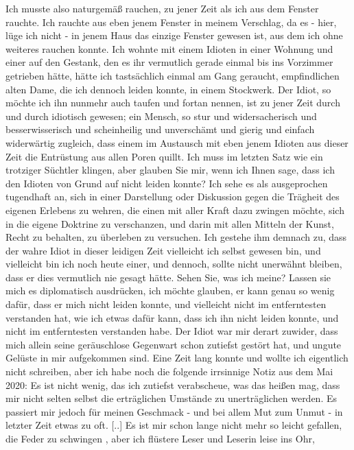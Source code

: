 \documentclass{scrbook}
\begin{document}
Ich musste also naturgemäß rauchen, zu jener Zeit als ich aus dem Fenster
rauchte. Ich rauchte aus eben jenem Fenster in meinem Verschlag, da es -
 hier,
lüge ich nicht - in jenem Haus das einzige Fenster gewesen ist, aus dem
 ich
ohne weiteres rauchen konnte. Ich wohnte mit einem Idioten in einer
 Wohnung und
einer auf den Gestank, den es ihr vermutlich gerade einmal bis
 ins Vorzimmer
getrieben hätte, hätte ich tastsächlich einmal am Gang
 geraucht, empfindlichen
alten Dame, die ich dennoch leiden konnte, in einem
 Stockwerk. Der Idiot, so
möchte ich ihn nunmehr auch taufen und fortan
 nennen, ist zu jener Zeit durch
und durch idiotisch gewesen; ein Mensch, so
 stur und widersacherisch und
besserwisserisch und scheinheilig und
 unverschämt und gierig und einfach
widerwärtig zugleich, dass einem im
 Austausch mit eben jenem Idioten aus dieser
Zeit die Entrüstung aus allen
 Poren quillt. Ich muss im letzten Satz wie ein
trotziger Süchtler klingen,
 aber glauben Sie mir, wenn ich Ihnen sage, dass ich
den Idioten von Grund auf
 nicht leiden konnte? Ich sehe es als ausgeprochen
tugendhaft an, sich in
 einer Darstellung oder Diskussion gegen die Trägheit des
eigenen Erlebens zu
 wehren, die einen mit aller Kraft dazu zwingen möchte, sich
in die eigene
 Doktrine zu verschanzen, und darin mit allen Mitteln der Kunst,
Recht zu
 behalten, zu überleben zu versuchen. Ich gestehe ihm demnach zu, dass
der
 wahre Idiot in dieser leidigen Zeit vielleicht ich selbst gewesen bin, und
vielleicht bin ich noch heute einer, und dennoch, sollte nicht unerwähnt
bleiben, dass er dies vermutlich nie gesagt hätte. Sehen Sie, was ich meine?
Lassen sie mich es diplomatisch ausdrücken, ich möchte glauben, er kann genau
so wenig dafür, dass er mich nicht leiden konnte, und vielleicht nicht im
entferntesten verstanden hat, wie ich etwas dafür kann, dass ich ihn nicht
leiden konnte, und nicht im entferntesten verstanden habe. Der Idiot war mir
derart zuwider, dass mich allein seine geräuschlose Gegenwart schon zutiefst
gestört hat, und ungute Gelüste in mir aufgekommen sind. Eine Zeit lang
 konnte
und wollte ich eigentlich nicht schreiben, aber ich habe noch die
 folgende
irrsinnige Notiz aus dem Mai 2020: Es ist nicht wenig, das ich
 zutiefst
verabscheue, was das heißen mag, dass mir nicht selten selbst die
 erträglichen
Umstände zu unerträglichen werden. Es passiert mir jedoch für
 meinen Geschmack
- und bei allem Mut zum Unmut - in letzter Zeit etwas zu
 oft. [..] Es ist mir
schon lange nicht mehr so leicht gefallen, \glqq die
 Feder zu schwingen \grqq,
aber ich flüstere Leser und Leserin leise ins Ohr,
\end{document}
